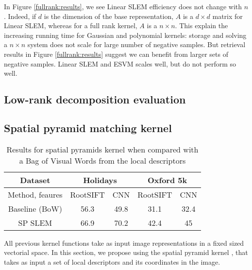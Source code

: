 In Figure \ref{fullrank:results}, we see Linear SLEM efficiency does not change with $n$.
Indeed, if $d$ is the dimension of the base representation, $A$ is a $d\times d$ matrix for Linear SLEM, whereas for a full rank kernel, $A$ is a $n\times n$.
This explain the increasing running time for Gaussian and polynomial kernels: storage and solving a $n\times n$ system does not scale for large number of negative samples.
But retrieval results in Figure \ref{fullrank:results} suggest we can benefit from larger sets of negative samples. Linear SLEM and ESVM scales well, but do not perform so well.

\vspace{3 mm}



\subsection{Low-rank decomposition evaluation}



\subsection{Spatial pyramid matching kernel}

\begin{table}[!h]
    \centering
    \caption{Results for spatial pyramids kernel when compared with a Bag of Visual Words from the local descriptors}
    \begin{tabular}{|c|c|c|c|c|}
    \hline
    Dataset & \multicolumn{2}{|c|}{\textbf{Holidays}} & \multicolumn{2}{|c|}{\textbf{Oxford 5k}}\\
    \hline
        Method, feaures & RootSIFT & CNN & RootSIFT
        &CNN \\
    \hline
    \hline
    Baseline (BoW) & 56.3 & 49.8 & 31.1 & 32.4 \\
        SP SLEM    & 66.9 & 70.2 & 42.4 & 45 \\
    \hline
    \end{tabular}
    \label{tab:spk}
\end{table}
All previous kernel functions take as input image representations in a fixed sized vectorial space. In this section, we propose using the spatial pyramid kernel \cite{GrauDa05}, that takes as input a set of local descriptors and its coordinates in the image.

